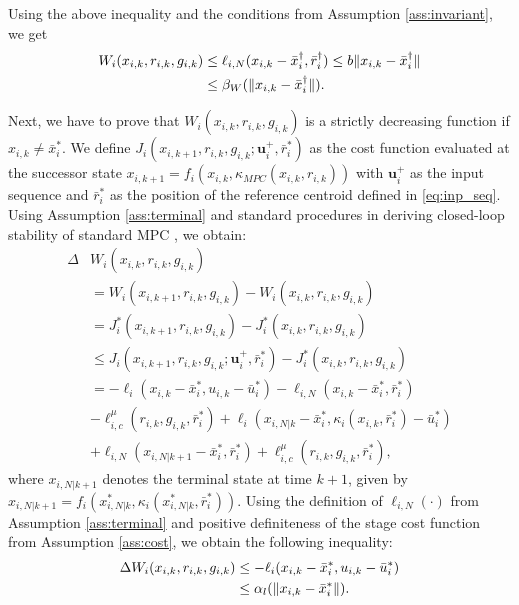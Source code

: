 Using the above inequality and the conditions from Assumption \ref{ass:invariant}, we get
\begin{align}
    W_i(x_{i,k}, r_{i,k}, g_{i,k}) & \leq\ell_{i,N}(x_{i,k} - \bar{x}_i^\dagger, \bar{r}_i^\dagger) \leq b\lVert x_{i,k} - \bar{x}_i^\dagger\rVert\nonumber\\
    &\leq \beta_W(\lVert x_{i,k} - \bar{x}_i^\dagger\rVert).
\end{align}

Next, we have to prove that $W_i(x_{i,k}, r_{i,k}, g_{i,k})$ is a strictly decreasing function if $x_{i,k}\neq \bar{x}_{i}^*$. We define $J_i(x_{i,k+1}, r_{i,k}, g_{i,k}; \mathbf{u}_i^+, \bar{r}_i^*)$ as the cost function evaluated at the successor state $x_{i,k+1} = f_i(x_{i,k}, \kappa_{MPC}(x_{i,k}, r_{i,k}))$ with $\mathbf{u}_i^+$ as the input sequence and $\bar{r}_i^*$ as the position of the reference centroid defined in \eqref{eq:inp_seq}. Using Assumption \ref{ass:terminal} and standard procedures in deriving closed-loop stability of standard MPC \cite{limon2008mpc, limon2018nonlinear, ferramosca2009mpc}, we obtain:
\begin{align}
    \Delta&W_i(x_{i,k}, r_{i,k}, g_{i,k})\nonumber
    \\&= W_i(x_{i,k+1}, r_{i,k}, g_{i,k}) - W_i(x_{i,k}, r_{i,k}, g_{i,k})\nonumber
    \\&= J_i^*(x_{i,k+1}, r_{i,k}, g_{i,k}) - J_i^*(x_{i,k}, r_{i,k}, g_{i,k})\nonumber
    \\&\leq J_i(x_{i,k+1}, r_{i,k}, g_{i,k}; \mathbf{u}_i^+, \bar{r}_i^*) - J_i^*(x_{i,k}, r_{i,k}, g_{i,k})\nonumber
    \\&=-\ell_{i}(x_{i,k} - \bar{x}_i^*, u_{i,k} - \bar{u}_i^*)-\ell_{i,N}(x_{i,k} - \bar{x}_i^*, \bar{r}_i^*)\nonumber
    \\&-\ell_{i,c}^\mu(r_{i,k},g_{i,k},\bar{r}_i^*) +\ell_{i}(x_{i,N|k} - \bar{x}_i^*, \kappa_i(x_{i,k}, \bar{r}_i^*) - \bar{u}_i^*)\nonumber
    \\&+\ell_{i,N}(x_{i,N|k+1} - \bar{x}_i^*, \bar{r}_i^*) + \ell_{i,c}^\mu(r_{i,k},g_{i,k},\bar{r}_i^*), 
\end{align}
where $x_{i,N|k+1}$ denotes the terminal state at time $k+1$, given by $x_{i,N|k+1} = f_i(x_{i,N|k}^*, \kappa_i(x_{i,N|k}^*, \bar{r}_i^*))$.
Using the definition of $\ell_{i,N}(\cdot)$ from Assumption \ref{ass:terminal} and positive definiteness of the stage cost function from Assumption \ref{ass:cost}, we obtain the following inequality:
\begin{align}
\label{eq:deltaW}
    \Delta W_i(x_{i,k}, r_{i,k}, g_{i,k}) &\leq -\ell_{i}(x_{i,k} - \bar{x}_i^*, u_{i,k} - \bar{u}_i^*)\nonumber
    \\ &\leq\alpha_l(\lVert x_{i,k} - \bar{x}_i^*\rVert).
\end{align}
